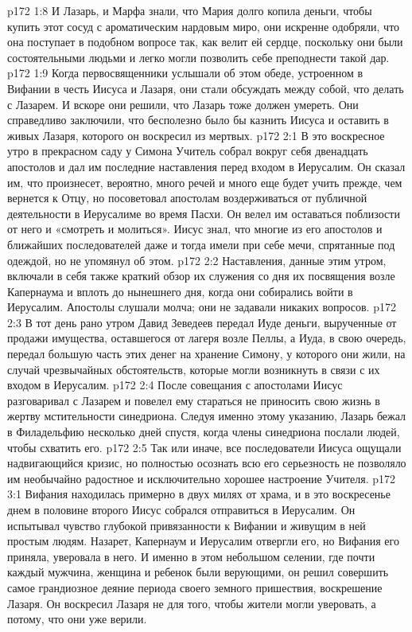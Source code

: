 \vs p172 1:8 И Лазарь, и Марфа знали, что Мария долго копила деньги, чтобы купить этот сосуд с ароматическим нардовым миро, они искренне одобряли, что она поступает в подобном вопросе так, как велит ей сердце, поскольку они были состоятельными людьми и легко могли позволить себе преподнести такой дар.
\vs p172 1:9 Когда первосвященники услышали об этом обеде, устроенном в Вифании в честь Иисуса и Лазаря, они стали обсуждать между собой, что делать с Лазарем. И вскоре они решили, что Лазарь тоже должен умереть. Они справедливо заключили, что бесполезно было бы казнить Иисуса и оставить в живых Лазаря, которого он воскресил из мертвых.
\vs p172 2:1 В это воскресное утро в прекрасном саду у Симона Учитель собрал вокруг себя двенадцать апостолов и дал им последние наставления перед входом в Иерусалим. Он сказал им, что произнесет, вероятно, много речей и много еще будет учить прежде, чем вернется к Отцу, но посоветовал апостолам воздерживаться от публичной деятельности в Иерусалиме во время Пасхи. Он велел им оставаться поблизости от него и «смотреть и молиться». Иисус знал, что многие из его апостолов и ближайших последователей даже и тогда имели при себе мечи, спрятанные под одеждой, но не упомянул об этом.
\vs p172 2:2 Наставления, данные этим утром, включали в себя также краткий обзор их служения со дня их посвящения возле Капернаума и вплоть до нынешнего дня, когда они собирались войти в Иерусалим. Апостолы слушали молча; они не задавали никаких вопросов.
\vs p172 2:3 В тот день рано утром Давид Зеведеев передал Иуде деньги, вырученные от продажи имущества, оставшегося от лагеря возле Пеллы, а Иуда, в свою очередь, передал большую часть этих денег на хранение Симону, у которого они жили, на случай чрезвычайных обстоятельств, которые могли возникнуть в связи с их входом в Иерусалим.
\vs p172 2:4 После совещания с апостолами Иисус разговаривал с Лазарем и повелел ему стараться не приносить свою жизнь в жертву мстительности синедриона. Следуя именно этому указанию, Лазарь бежал в Филадельфию несколько дней спустя, когда члены синедриона послали людей, чтобы схватить его.
\vs p172 2:5 Так или иначе, все последователи Иисуса ощущали надвигающийся кризис, но полностью осознать всю его серьезность не позволяло им необычайно радостное и исключительно хорошее настроение Учителя.
\vs p172 3:1 Вифания находилась примерно в двух милях от храма, и в это воскресенье днем в половине второго Иисус собрался отправиться в Иерусалим. Он испытывал чувство глубокой привязанности к Вифании и живущим в ней простым людям. Назарет, Капернаум и Иерусалим отвергли его, но Вифания его приняла, уверовала в него. И именно в этом небольшом селении, где почти каждый мужчина, женщина и ребенок были верующими, он решил совершить самое грандиозное деяние периода своего земного пришествия, воскрешение Лазаря. Он воскресил Лазаря не для того, чтобы жители могли уверовать, а потому, что они уже верили.
